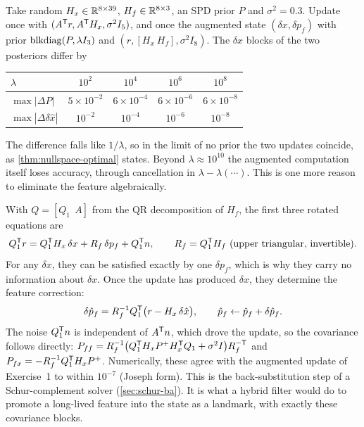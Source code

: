\begin{solutions}
  \item Take random $H_x \in \mathbb{R}^{8\times39}$, $H_f \in \mathbb{R}^{8\times3}$, an SPD prior $P$ and $\sigma^2 = 0.3$. Update once with $(A^{\mathsf{T}} r, A^{\mathsf{T}} H_x, \sigma^2I_5)$, and once the augmented state
        $(\delta x, \delta p_f)$ with prior $\operatorname{blkdiag}(P, \lambda I_3)$ and $(r, [H_x\ H_f], \sigma^2I_8)$. The $\delta x$ blocks of the two posteriors differ by
        \begin{center}\small
        \begin{tabular}{@{}l c c c c@{}}
        \toprule
        $\lambda$ & $10^2$ & $10^4$ & $10^6$ & $10^8$ \\
        \midrule
        $\max|\Delta P|$ & $5\times10^{-2}$ & $6\times10^{-4}$ & $6\times10^{-6}$ & $6\times10^{-8}$ \\
        $\max|\Delta\delta\hat x|$ & $10^{-2}$ & $10^{-4}$ & $10^{-6}$ & $10^{-8}$ \\
        \bottomrule
        \end{tabular}
        \end{center}
        The difference falls like $1/\lambda$, so in the limit of no prior the two updates coincide, as \cref{thm:nullspace-optimal} states. Beyond $\lambda \approx 10^{10}$ the
        augmented computation itself loses accuracy, through cancellation in $\lambda - \lambda(\cdots)$. This is one more reason to eliminate the feature algebraically.

  \item With $Q = [Q_1\ \ A]$ from the QR decomposition of $H_f$, the first three rotated equations are
        \[
          Q_1^{\mathsf{T}} r = Q_1^{\mathsf{T}} H_x\,\delta x + R_f\,\delta p_f + Q_1^{\mathsf{T}} n, \qquad R_f = Q_1^{\mathsf{T}} H_f \ \text{(upper triangular, invertible)}.
        \]
        For any $\delta x$, they can be satisfied exactly by one $\delta p_f$, which is why they carry no information about $\delta x$. Once the update has produced $\delta\hat x$, they
        determine the feature correction:
        \[
          \delta\hat p_f = R_f^{-1} Q_1^{\mathsf{T}}\big(r - H_x\,\delta\hat x\big), \qquad \hat p_f \gets \hat p_f + \delta\hat p_f .
        \]
        The noise $Q_1^{\mathsf{T}} n$ is independent of $A^{\mathsf{T}} n$, which drove the update, so the covariance follows directly:
        $P_{ff} = R_f^{-1}\big(Q_1^{\mathsf{T}} H_xP^+H_x^{\mathsf{T}} Q_1 + \sigma^2I\big)R_f^{-\mathsf{T}}$ and $P_{fx} = -R_f^{-1} Q_1^{\mathsf{T}} H_xP^+$. Numerically, these agree with the augmented update of Exercise~1 to within $10^{-7}$ (Joseph
        form). This is the back-substitution step of a Schur-complement solver (\cref{sec:schur-ba}). It is what a hybrid filter would do to promote a long-lived
        feature into the state as a landmark, with exactly these covariance blocks.


\end{solutions}
